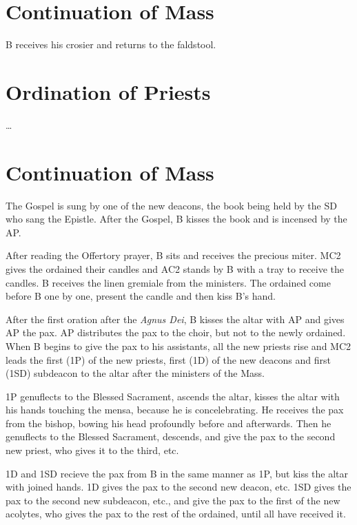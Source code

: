\documentclass[letterpaper]{report}
\begin{document}
{    %

    \section{Continuation of Mass}

    \rubric B receives his crosier and returns to the faldstool.

    \section{Ordination of Priests}

    \rubric \dots

    \section{Continuation of Mass}

    \rubric The Gospel is sung by one of the new deacons, the book being held
    by the SD who sang the Epistle. After the Gospel, B kisses the book and is
    incensed by the AP.

    \rubric After reading the Offertory prayer, B sits and receives the
    precious miter. MC2 gives the ordained their candles and AC2 stands by B
    with a tray to receive the candles. B receives the linen gremiale from the
    ministers. The ordained come before B one by one, present the candle and
    then kiss B's hand.

    \rubric After the first oration after the \textit{Agnus Dei}, B kisses the
    altar with AP and gives AP the pax. AP distributes the pax to the choir,
    but not to the newly ordained. When B begins to give the pax to his
    assistants, all the new priests rise and MC2 leads the first (1P) of the
    new priests, first (1D) of the new deacons and first (1SD) subdeacon to the
    altar after the ministers of the Mass.

    \rubric 1P genuflects to the Blessed Sacrament, ascends the altar, kisses
    the altar with his hands touching the mensa, because he is concelebrating.
    He receives the pax from the bishop, bowing his head profoundly before and
    afterwards. Then he genuflects to the Blessed Sacrament, descends, and give
    the pax to the second new priest, who gives it to the third, etc.

    \rubric 1D and 1SD recieve the pax from B in the same manner as 1P, but
    kiss the altar with joined hands. 1D gives the pax to the second new
    deacon, etc. 1SD gives the pax to the second new subdeacon, etc., and give
    the pax to the first of the new acolytes, who gives the pax to the rest of
    the ordained, until all have received it.

}
\end{document}
